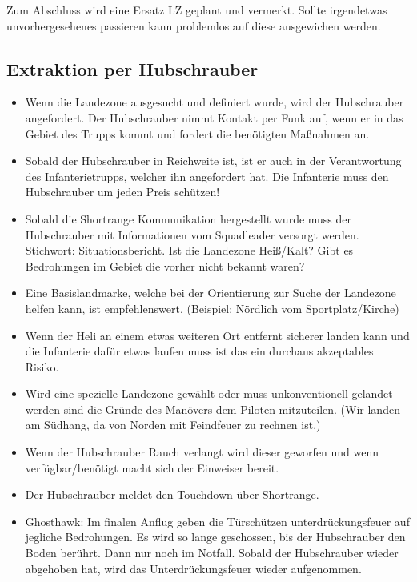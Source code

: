 	Zum Abschluss wird eine Ersatz LZ geplant und vermerkt. Sollte irgendetwas unvorhergesehenes passieren kann problemlos auf diese ausgewichen werden.

\subsection{Extraktion per Hubschrauber}

 	\begin{itemize} 
		\item Wenn die Landezone ausgesucht und definiert wurde, wird der Hubschrauber angefordert. Der Hubschrauber nimmt Kontakt per Funk auf, wenn er in das Gebiet des Trupps kommt und fordert die benötigten Maßnahmen an.

		\item Sobald der Hubschrauber in Reichweite ist, ist er auch in der Verantwortung des Infanterietrupps, welcher ihn angefordert hat. Die Infanterie muss den Hubschrauber um jeden Preis schützen!

		\item Sobald die Shortrange Kommunikation hergestellt wurde muss der Hubschrauber mit Informationen vom Squadleader versorgt werden. Stichwort: Situationsbericht. Ist die Landezone Heiß/Kalt? Gibt es Bedrohungen im Gebiet die vorher nicht bekannt waren?

		\item Eine Basislandmarke, welche bei der Orientierung zur Suche der Landezone helfen kann, ist empfehlenswert. (Beispiel: Nördlich vom Sportplatz/Kirche)

		\item Wenn der Heli an einem etwas weiteren Ort entfernt sicherer landen kann und die Infanterie dafür etwas laufen muss ist das ein durchaus akzeptables Risiko.

		\item Wird eine spezielle Landezone gewählt oder muss unkonventionell gelandet werden sind die Gründe des Manövers dem Piloten mitzuteilen. (Wir landen am Südhang, da von Norden mit Feindfeuer zu rechnen ist.)

		\item Wenn der Hubschrauber Rauch verlangt wird dieser geworfen und wenn verfügbar/benötigt macht sich der Einweiser bereit.

		\item Der Hubschrauber meldet den Touchdown über Shortrange.

		\item Ghosthawk: Im finalen Anflug geben die Türschützen unterdrückungsfeuer auf jegliche Bedrohungen. Es wird so lange geschossen, bis der Hubschrauber den Boden berührt. Dann nur noch im Notfall. Sobald der Hubschrauber wieder abgehoben hat, wird das Unterdrückungsfeuer wieder aufgenommen.


\end{itemize}
